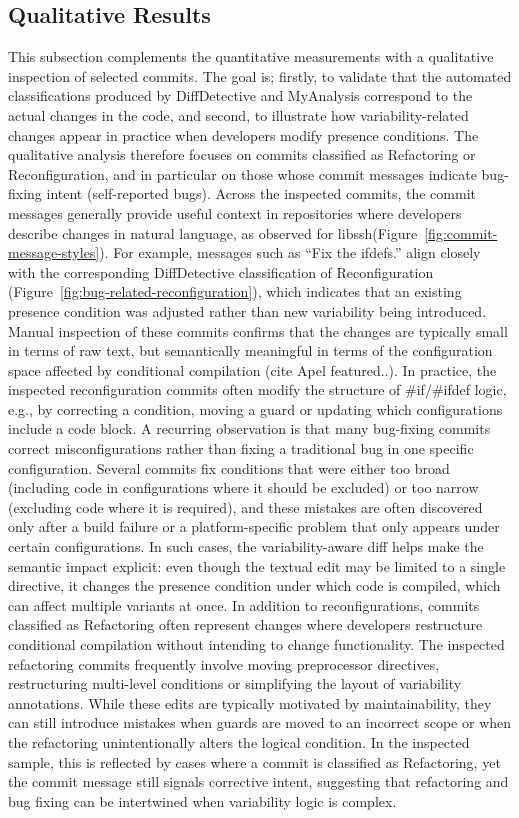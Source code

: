 \subsection{Qualitative Results}
This subsection complements the quantitative measurements with a qualitative inspection of selected commits. The goal is; firstly, to validate that the automated classifications produced by DiffDetective and MyAnalysis correspond to the actual changes in the code, and second, to illustrate how variability-related changes appear in practice when developers modify presence conditions. The qualitative analysis therefore focuses on commits classified as Refactoring or Reconfiguration, and in particular on those whose commit messages indicate bug-fixing intent (self-reported bugs).
Across the inspected commits, the commit messages generally provide useful context in repositories where developers describe changes in natural language, as observed for libssh(Figure~\ref{fig:commit-message-styles}). For example, messages such as ``Fix the ifdefs.'' align closely with the corresponding DiffDetective classification of Reconfiguration (Figure~\ref{fig:bug-related-reconfiguration}), which indicates that an existing presence condition was adjusted rather than new variability being introduced. Manual inspection of these commits confirms that the changes are typically small in terms of raw text, but semantically meaningful in terms of the configuration space affected by conditional compilation (cite Apel featured..). In practice, the inspected reconfiguration commits often modify the structure of \#if/\#ifdef logic, e.g., by correcting a condition, moving a guard or updating which configurations include a code block.
A recurring observation is that many bug-fixing commits correct misconfigurations rather than fixing a traditional bug in one specific configuration.
Several commits fix conditions that were either too broad (including code in configurations where it should be excluded) or too narrow (excluding code where it is required), and these mistakes are often discovered only after a build failure or a platform-specific problem that only appears under certain configurations. In such cases, the variability-aware diff helps make the semantic impact explicit: even though the textual edit may be limited to a single directive, it changes the presence condition under which code is compiled, which can affect multiple variants at once.
In addition to reconfigurations, commits classified as Refactoring often represent changes where developers restructure conditional compilation without intending to change functionality. The inspected refactoring commits frequently involve moving preprocessor directives, restructuring multi-level conditions or simplifying the layout of variability annotations. While these edits are typically motivated by maintainability, they can still introduce mistakes when guards are moved to an incorrect scope or when the refactoring unintentionally alters the logical condition. In the inspected sample, this is reflected by cases where a commit is classified as Refactoring, yet the commit message still signals corrective intent, suggesting that refactoring and bug fixing can be intertwined when variability logic is complex.
